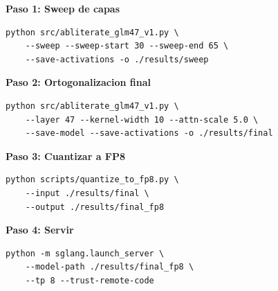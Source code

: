 \documentclass[11pt,a4paper]{article}
\begin{document}
\textbf{Paso 1: Sweep de capas}
\begin{verbatim}
python src/abliterate_glm47_v1.py \
    --sweep --sweep-start 30 --sweep-end 65 \
    --save-activations -o ./results/sweep
\end{verbatim}

\textbf{Paso 2: Ortogonalizacion final}
\begin{verbatim}
python src/abliterate_glm47_v1.py \
    --layer 47 --kernel-width 10 --attn-scale 5.0 \
    --save-model --save-activations -o ./results/final
\end{verbatim}

\textbf{Paso 3: Cuantizar a FP8}
\begin{verbatim}
python scripts/quantize_to_fp8.py \
    --input ./results/final \
    --output ./results/final_fp8
\end{verbatim}

\textbf{Paso 4: Servir}
\begin{verbatim}
python -m sglang.launch_server \
    --model-path ./results/final_fp8 \
    --tp 8 --trust-remote-code
\end{verbatim}
\end{document}
